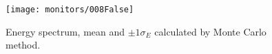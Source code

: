 \begin{figure}[htb]
\texttt{[image: monitors/008False]}
\caption{Energy spectrum, mean and $\pm 1\sigma_E$ calculated by Monte Carlo method.
}
\label{fig:Spectrum1}
\end{figure}